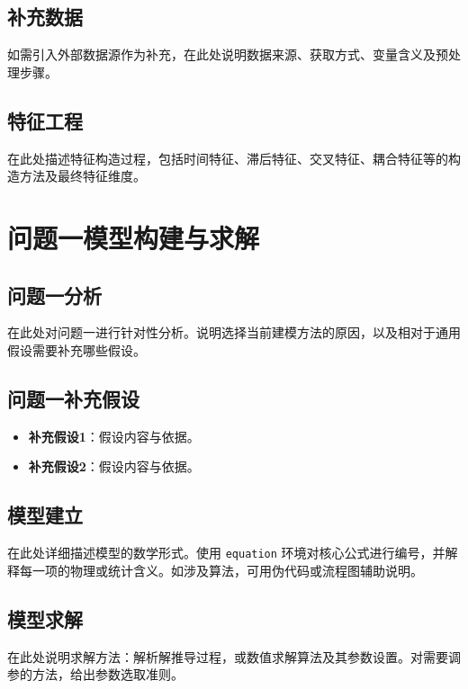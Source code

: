 \documentclass[12pt,a4paper]{article}
\begin{document}
\subsection{补充数据}

如需引入外部数据源作为补充，在此处说明数据来源、获取方式、变量含义及预处理步骤。

\subsection{特征工程}

在此处描述特征构造过程，包括时间特征、滞后特征、交叉特征、耦合特征等的构造方法及最终特征维度。

\section{问题一模型构建与求解}

\subsection{问题一分析}

在此处对问题一进行针对性分析。说明选择当前建模方法的原因，以及相对于通用假设需要补充哪些假设。

\subsection{问题一补充假设}

\begin{itemize}
    \item \textbf{补充假设1}：假设内容与依据。
    \item \textbf{补充假设2}：假设内容与依据。
\end{itemize}

\subsection{模型建立}

在此处详细描述模型的数学形式。使用 \texttt{equation} 环境对核心公式进行编号，并解释每一项的物理或统计含义。如涉及算法，可用伪代码或流程图辅助说明。

\subsection{模型求解}

在此处说明求解方法：解析解推导过程，或数值求解算法及其参数设置。对需要调参的方法，给出参数选取准则。
\end{document}
